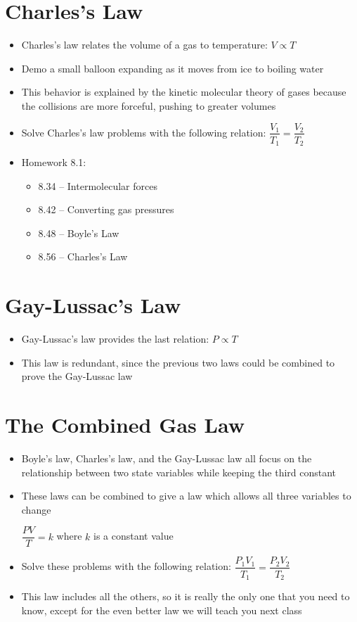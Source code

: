 \documentclass[12pt, openany, letterpaper]{memoir}
\begin{document}
\section{Charles's Law}
\begin{itemize}
	\item Charles's law relates the volume of a gas to temperature: $V\propto T$
	\item Demo a small balloon expanding as it moves from ice to boiling water
	\item This behavior is explained by the kinetic molecular theory of gases because the collisions are more forceful, pushing to greater volumes
	\item Solve Charles's law problems with the following relation: $\dfrac{V_1}{T_1}=\dfrac{V_2}{T_2}$
	\item Homework 8.1:
	      \begin{itemize}
		      \item 8.34 -- Intermolecular forces
		      \item 8.42 -- Converting gas pressures
		      \item 8.48 -- Boyle's Law
		      \item 8.56 -- Charles's Law
	      \end{itemize}
\end{itemize}
\section{Gay-Lussac's Law}
\begin{itemize}
	\item Gay-Lussac's law provides the last relation: $P\propto T$
	\item This law is redundant, since the previous two laws could be combined to prove the Gay-Lussac law
\end{itemize}
\section{The Combined Gas Law}
\begin{itemize}
	\item Boyle's law, Charles's law, and the Gay-Lussac law all focus on the relationship between two state variables while keeping the third constant
	\item These laws can be combined to give a law which allows all three variables to change

	      $\dfrac{PV}{T} = k$ where $k$ is a constant value
	\item Solve these problems with the following relation: $\dfrac{P_1V_1}{T_1}=\dfrac{P_2V_2}{T_2}$
	\item This law includes all the others, so it is really the only one that you need to know, except for the even better law we will teach you next class
\end{itemize}
\end{document}

